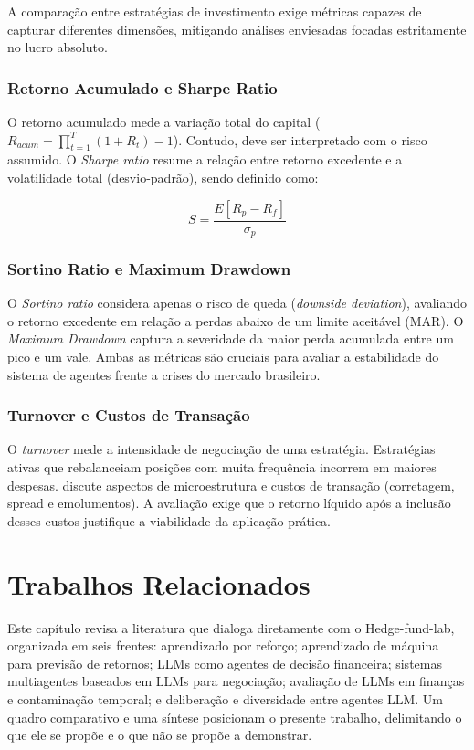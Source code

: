 \documentclass{eic-bcc-tcc}
\begin{document}
A comparação entre estratégias de investimento exige métricas capazes de capturar diferentes dimensões, mitigando análises enviesadas focadas estritamente no lucro absoluto.

\subsection{Retorno Acumulado e Sharpe Ratio}
O retorno acumulado mede a variação total do capital (\(R_{acum} = \prod_{t=1}^{T} (1 + R_t) - 1\)). Contudo, deve ser interpretado com o risco assumido. O \textit{Sharpe ratio} \citep{Sharpe1994, Lo2002} resume a relação entre retorno excedente e a volatilidade total (desvio-padrão), sendo definido como:

\begin{equation}
S = \frac{E[R_p - R_f]}{\sigma_p}
\end{equation}

\subsection{Sortino Ratio e Maximum Drawdown}
O \textit{Sortino ratio} \citep{Sortino1994} considera apenas o risco de queda (\textit{downside deviation}), avaliando o retorno excedente em relação a perdas abaixo de um limite aceitável (MAR). O \textit{Maximum Drawdown} \citep{Magdon2004} captura a severidade da maior perda acumulada entre um pico e um vale. Ambas as métricas são cruciais para avaliar a estabilidade do sistema de agentes frente a crises do mercado brasileiro.

\subsection{Turnover e Custos de Transação}
O \textit{turnover} mede a intensidade de negociação de uma estratégia. Estratégias ativas que rebalanceiam posições com muita frequência incorrem em maiores despesas. \citet{Harris2003} discute aspectos de microestrutura e custos de transação (corretagem, spread e emolumentos). A avaliação exige que o retorno líquido após a inclusão desses custos justifique a viabilidade da aplicação prática.

\chapter{Trabalhos Relacionados}
\label{cha:relacionados}

Este capítulo revisa a literatura que dialoga diretamente com o Hedge-fund-lab, organizada em seis frentes: aprendizado por reforço; aprendizado de máquina para previsão de retornos; LLMs como agentes de decisão financeira; sistemas multiagentes baseados em LLMs para negociação; avaliação de LLMs em finanças e contaminação temporal; e deliberação e diversidade entre agentes LLM. Um quadro comparativo e uma síntese posicionam o presente trabalho, delimitando o que ele se propõe e o que não se propõe a demonstrar.
\end{document}

